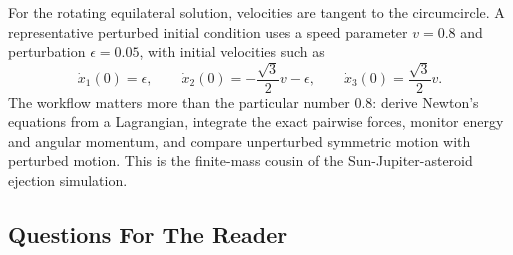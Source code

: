 For the rotating equilateral solution, velocities are tangent to the
circumcircle. A representative perturbed initial condition uses a speed
parameter \(v=0.8\) and perturbation \(\epsilon=0.05\), with initial velocities
such as
\[
  \dot x_1(0)=\epsilon,\qquad
  \dot x_2(0)=-\frac{\sqrt3}{2}v-\epsilon,\qquad
  \dot x_3(0)=\frac{\sqrt3}{2}v.
\]
The workflow matters more than the particular number \(0.8\): derive Newton's
equations from a Lagrangian, integrate the exact pairwise forces, monitor
energy and angular momentum, and compare unperturbed symmetric motion with
perturbed motion. This is the finite-mass cousin of the Sun-Jupiter-asteroid
ejection simulation.

\subsection{Questions For The Reader}
\label{sec:three-body-questions}

